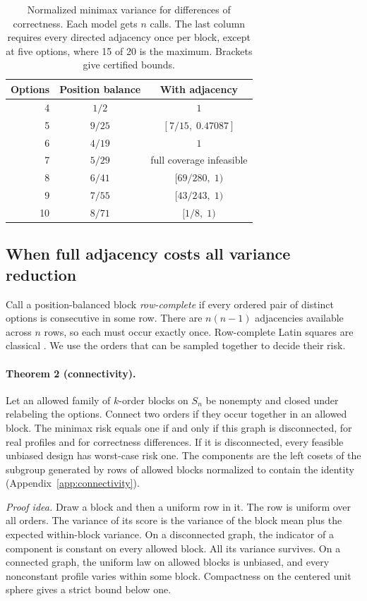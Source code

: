\begin{table}[t]
\centering
\caption{Normalized minimax variance for differences of correctness.
Each model gets $n$ calls. The last column requires every directed
adjacency once per block, except at five options, where 15 of 20
is the maximum. Brackets give certified bounds.}
\label{tab:all-n}
\small
\begin{tabular}{rcc}
\toprule
Options & Position balance & With adjacency \\
\midrule
4 & $1/2$ & $1$ \\
5 & $9/25$ & $[7/15,\;0.47087]$ \\
6 & $4/19$ & $1$ \\
7 & $5/29$ & full coverage infeasible \\
8 & $6/41$ & $[69/280,\;1)$ \\
9 & $7/55$ & $[43/243,\;1)$ \\
10 & $8/71$ & $[1/8,\;1)$ \\
\bottomrule
\end{tabular}
\end{table}

\subsection{When full adjacency costs all variance reduction}
\label{sec:connectivity}
Call a position-balanced block \emph{row-complete} if every ordered
pair of distinct options is consecutive in some row. There are
$n(n-1)$ adjacencies available across $n$ rows, so each must occur
exactly once. Row-complete Latin squares are classical
\citep{williams1949,wanlesscatalogue}. We use the orders that
can be sampled together to decide their risk.

\paragraph{Theorem 2 (connectivity).}
Let an allowed family of $k$-order blocks on $S_n$ be nonempty and
closed under relabeling the options. Connect two orders if they
occur together in an allowed block. The minimax risk equals one
if and only if this graph is disconnected, for real profiles and
for correctness differences. If it is disconnected, every feasible
unbiased design has worst-case risk one. The components are the left
cosets of the subgroup generated by rows of allowed blocks normalized
to contain the identity (Appendix~\ref{app:connectivity}).

\emph{Proof idea.} Draw a block and then a uniform row in it. The row
is uniform over all orders. The variance of its score is the variance of
the block mean plus the expected within-block variance. On a disconnected
graph, the indicator of a component is constant on every allowed
block. All its variance survives. On a connected graph, the uniform
law on allowed blocks is unbiased, and every nonconstant profile varies
within some block. Compactness on the centered unit sphere gives a
strict bound below one.

